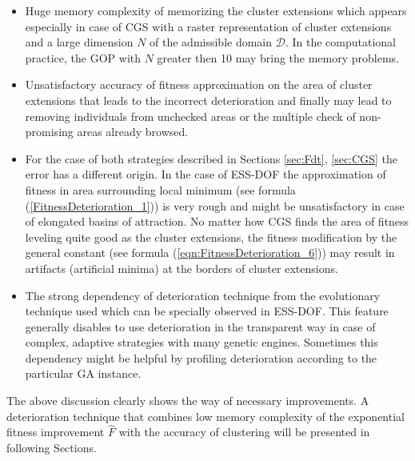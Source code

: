 \begin{itemize}
\item
Huge memory complexity of memorizing the cluster extensions
which appears especially in case of CGS with a raster representation
of cluster extensions and a large dimension $N$ 
of the admissible domain $\mathcal{D}$.
In the computational practice, the GOP with $N$ greater then 10
may bring the memory problems.

\item
Unsatisfactory accuracy of fitness approximation on the area of cluster extensions
that leads to the incorrect deterioration and finally may lead to removing
individuals from unchecked areas or the multiple check of non-promising areas
already browsed.

\item
For the case of both strategies described in Sections \ref{sec:Fdt}, \ref{sec:CGS}  
the error has a different origin. In the case of ESS-DOF the approximation of fitness
in area surrounding local minimum (see formula (\ref{FitnessDeterioration_1}))
is very rough and might be unsatisfactory in case of elongated basins of attraction.
No matter how CGS finds the area of fitness leveling quite good 
as the cluster extensions, the fitness
modification by the general constant (see formula (\ref{eqn:FitnessDeterioration_6})) 
may result in artifacts (artificial minima) at the borders of cluster extensions.

\item
The strong dependency of deterioration technique from the evolutionary technique 
used which can be specially observed in ESS-DOF. This feature 
generally disables to use deterioration in the transparent way
in case of complex, adaptive strategies with many genetic engines.
Sometimes this dependency might be helpful by profiling deterioration
according to the particular GA instance.
\end{itemize}

The above discussion clearly shows the way of necessary improvements.
A deterioration technique that combines low memory complexity
of the exponential fitness improvement $\hat{F}$ with the accuracy of
clustering will be presented in following Sections.

